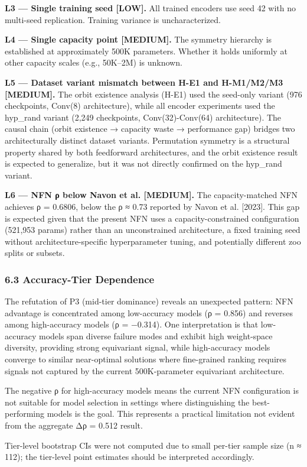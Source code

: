 \textbf{L3 — Single training seed [LOW].} All trained encoders use seed 42 with no multi-seed replication. Training variance is uncharacterized.

\textbf{L4 — Single capacity point [MEDIUM].} The symmetry hierarchy is established at approximately 500K parameters. Whether it holds uniformly at other capacity scales (e.g., 50K–2M) is unknown.

\textbf{L5 — Dataset variant mismatch between H-E1 and H-M1/M2/M3 [MEDIUM].} The orbit existence analysis (H-E1) used the seed-only variant (976 checkpoints, Conv(8) architecture), while all encoder experiments used the hyp_rand variant (2,249 checkpoints, Conv(32)-Conv(64) architecture). The causal chain (orbit existence → capacity waste → performance gap) bridges two architecturally distinct dataset variants. Permutation symmetry is a structural property shared by both feedforward architectures, and the orbit existence result is expected to generalize, but it was not directly confirmed on the hyp_rand variant.

\textbf{L6 — NFN ρ below Navon et al. [MEDIUM].} The capacity-matched NFN achieves ρ = 0.6806, below the ρ ≈ 0.73 reported by Navon et al. [2023]. This gap is expected given that the present NFN uses a capacity-constrained configuration (521,953 params) rather than an unconstrained architecture, a fixed training seed without architecture-specific hyperparameter tuning, and potentially different zoo splits or subsets.

\subsubsection{6.3 Accuracy-Tier Dependence}

The refutation of P3 (mid-tier dominance) reveals an unexpected pattern: NFN advantage is concentrated among low-accuracy models (ρ = 0.856) and reverses among high-accuracy models (ρ = −0.314). One interpretation is that low-accuracy models span diverse failure modes and exhibit high weight-space diversity, providing strong equivariant signal, while high-accuracy models converge to similar near-optimal solutions where fine-grained ranking requires signals not captured by the current 500K-parameter equivariant architecture.

The negative ρ for high-accuracy models means the current NFN configuration is not suitable for model selection in settings where distinguishing the best-performing models is the goal. This represents a practical limitation not evident from the aggregate Δρ = 0.512 result.

Tier-level bootstrap CIs were not computed due to small per-tier sample size (n ≈ 112); the tier-level point estimates should be interpreted accordingly.

